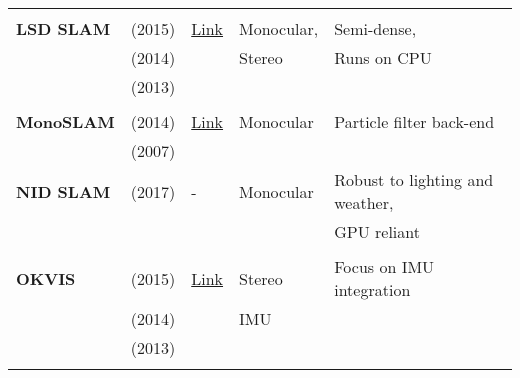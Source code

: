 {\begin{longtable}{l|l|l|l|l}
			&                                   &                                                                    &                       &\\
			\textbf{LSD SLAM}      & \cite{Engel2015} (2015)           & {\href{https://github.com/tum-vision/lsd_slam}{Link}}              & Monocular,            & Semi-dense,\\
			& \cite{engel14eccv} (2014)           &                                                                    & Stereo                & Runs on CPU\\
			& \cite{engel2013iccv} (2013)           &                                                                    &                       &\\
			&                                   &                                                                    &                       &\\
			\textbf{MonoSLAM}      & \cite{Russo2014} (2014)           & {\href{https://github.com/rrg-polito/mono-slam}{Link}}             & Monocular             & Particle filter back-end\\
			& \cite{Davison2007} (2007)         &                                                                    &                       &\\
			\textbf{NID SLAM}      & \cite{Pascoe2017} (2017)          & -                                                                  & Monocular             & Robust to lighting and weather,\\
			&                                   &                                                                    &                       & GPU reliant\\
			&                                   &                                                                    &                       &\\
			\textbf{OKVIS}         & \cite{Leutenegger2015} (2015)     & {\href{https://github.com/ethz-asl/okvis_ros}{Link}}               & Stereo                & Focus on IMU integration\\
			& \cite{Leutenegger2014} (2014)     &                                                                    & IMU                   &\\
			& \cite{Leutenegger2013} (2013)     &                                                                    &                       &\\
			&                                   &                                                                    &                       &\\

\end{longtable}}
